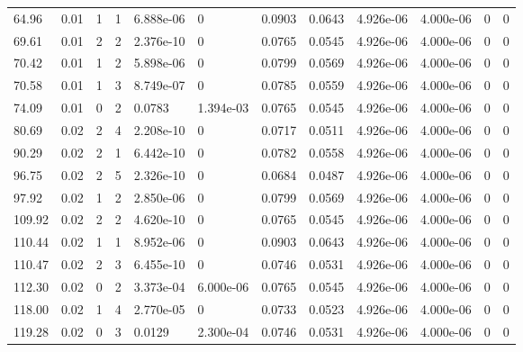 \documentclass[preview]{standalone}
\begin{document}
{{\begin{tabular}{L{1.2cm}C{1.2cm} C{0.3cm}C{0.5cm} C{1.4cm}C{1.4cm} C{1.4cm}C{1.4cm} C{1.6cm}C{1.6cm} C{1.6cm}C{1.6cm}}
  64.96  &  0.01  & 1     &  1 &  6.888e-06  & 0  &  0.0903&   0.0643& 4.926e-06 & 4.000e-06   &  0 & 0  \\ 
  69.61  &  0.01  & 2     &  2 &  2.376e-10  & 0  &  0.0765&   0.0545& 4.926e-06 & 4.000e-06   &  0 & 0  \\ 
  70.42  &  0.01  & 1     &  2 &  5.898e-06  & 0  &  0.0799&   0.0569& 4.926e-06 & 4.000e-06   &  0 & 0  \\ 
  70.58  &  0.01  & 1     &  3 &  8.749e-07  & 0  &  0.0785&   0.0559& 4.926e-06 & 4.000e-06   &  0 & 0  \\ 
  74.09  &  0.01  & 0     &  2 &  0.0783  & 1.394e-03  &  0.0765&   0.0545& 4.926e-06 & 4.000e-06   &  0 & 0  \\ 
  80.69  &  0.02  & 2     &  4 &  2.208e-10  & 0  &  0.0717&   0.0511& 4.926e-06 & 4.000e-06   &  0 & 0  \\ 
  90.29  &  0.02  & 2     &  1 &  6.442e-10  & 0  &  0.0782&   0.0558& 4.926e-06 & 4.000e-06   &  0 & 0  \\ 
  96.75  &  0.02  & 2     &  5 &  2.326e-10  & 0  &  0.0684&   0.0487& 4.926e-06 & 4.000e-06   &  0 & 0  \\ 
  97.92  &  0.02  & 1     &  2 &  2.850e-06  & 0  &  0.0799&   0.0569& 4.926e-06 & 4.000e-06   &  0 & 0  \\ 
  109.92  &  0.02  & 2     &  2 &  4.620e-10  & 0  &  0.0765&   0.0545& 4.926e-06 & 4.000e-06   &  0 & 0  \\ 
  110.44  &  0.02  & 1     &  1 &  8.952e-06  & 0  &  0.0903&   0.0643& 4.926e-06 & 4.000e-06   &  0 & 0  \\ 
  110.47  &  0.02  & 2     &  3 &  6.455e-10  & 0  &  0.0746&   0.0531& 4.926e-06 & 4.000e-06   &  0 & 0  \\ 
  112.30  &  0.02  & 0     &  2 &  3.373e-04  & 6.000e-06  &  0.0765&   0.0545& 4.926e-06 & 4.000e-06   &  0 & 0  \\ 
  118.00  &  0.02  & 1     &  4 &  2.770e-05  & 0  &  0.0733&   0.0523& 4.926e-06 & 4.000e-06   &  0 & 0  \\ 
  119.28  &  0.02  & 0     &  3 &  0.0129  & 2.300e-04  &  0.0746&   0.0531& 4.926e-06 & 4.000e-06   &  0 & 0  \\ 
\hline 
\end{tabular} 

}}
\end{document}
